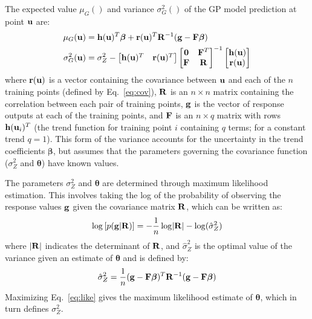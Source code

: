 The expected value $\mu_G()$ and variance $\sigma_G^2()$ of the GP model 
prediction at point ${\bf u}$ are:
\begin{align}
\mu_G({\bf u}) &= {\bf h}({\bf u})^T{\boldsymbol \beta} + 
  {\bf r}({\bf u})^T{\bf R}^{-1}({\bf g} - {\bf F}{\boldsymbol \beta}) 
  \label{eq:exp} \\
\sigma_G^2({\bf u}) &= \sigma_Z^2 - 
  \begin{bmatrix} {\bf h}({\bf u})^T  & 
                  {\bf r}({\bf u})^T  \end{bmatrix}
  \begin{bmatrix} {\bf 0} & {\bf F}^T \\ 
                  {\bf F} & {\bf R}   \end{bmatrix}^{-1}
  \begin{bmatrix} {\bf h}({\bf u})    \\ 
                  {\bf r}({\bf u})    \end{bmatrix} \label{eq:var}
\end{align}
where ${\bf r}({\bf u})$ is a vector containing the covariance between 
${\bf u}$ and each of the $n$ training points (defined by Eq.~\ref{eq:cov}),
${\bf R}$ is an $n \times n$ matrix containing the correlation between each
pair of training points,
${\bf g}$ is the vector of response outputs at each of the training points, and
${\bf F}$ is an $n \times q$ matrix with rows ${\bf h}({\bf u}_i)^T$ (the
trend function for training point $i$ containing $q$ terms; for a constant
trend $q\!=\!1$).
This form of the variance accounts for the uncertainty in the trend 
coefficients $\boldsymbol \beta$, but assumes that the parameters governing
the covariance function ($\sigma_Z^2$ and $\boldsymbol \theta$) have known 
values.

The parameters $\sigma_Z^2$ and ${\boldsymbol \theta}$ are determined through 
maximum likelihood estimation.
This involves taking the log of the probability of observing the response 
values ${\bf g}$ given the covariance matrix ${\bf R}$, which can be written 
as:~\cite{Sac89}
\begin{equation}
\log \left[ p({\bf g} | {\bf R}) \right] = 
  -\frac{1}{n} \log \lvert{\bf R}\rvert - \log(\hat{\sigma}_Z^2) 
  \label{eq:like}
\end{equation}
\noindent where $\lvert {\bf R} \rvert$ indicates the determinant of ${\bf R}$,
and $\hat{\sigma}_Z^2$ is the optimal value of the variance given an estimate
of $\boldsymbol \theta$ and is defined by:
\begin{equation}
\hat{\sigma}_Z^2 = \frac{1}{n}({\bf g}-{\bf F}{\boldsymbol \beta})^T
  {\bf R}^{-1}({\bf g}-{\bf F}{\boldsymbol \beta})
\end{equation}
\noindent Maximizing Eq.~\ref{eq:like} gives the maximum likelihood estimate 
of $\boldsymbol \theta$, which in turn defines $\sigma_Z^2$.

